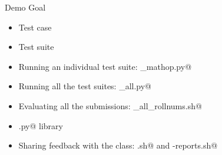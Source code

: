 \documentclass[aspectratio=169]{beamer}
\begin{document}
\begin{frame}{Demo}
{Goal}
\begin{scriptsize}

\begin{itemize}
\item Test case
\item Test suite
\item Running an individual test suite: \lstinline@eval_mathop.py@
\item Running all the test suites: \lstinline@eval_all.py@
\item Evaluating all the submissions: \lstinline@eval_all_rollnums.sh@
\item \lstinline@evaluate.py@ library
\item Sharing feedback with the class: \lstinline@pack.sh@ and \lstinline@send-reports.sh@
\end{itemize}
\end{scriptsize}
\end{frame}
\end{document}
